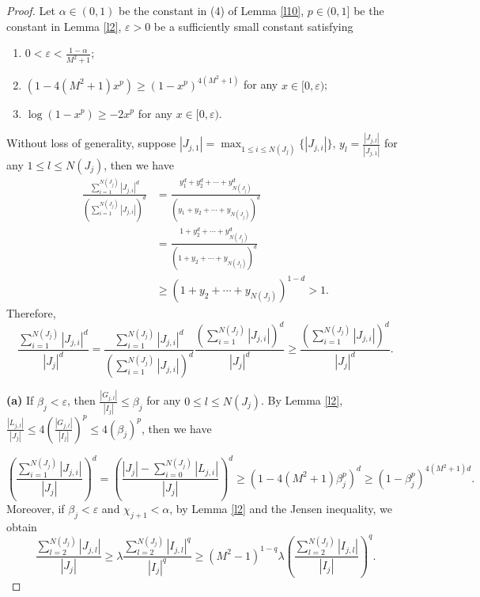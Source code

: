\documentclass[reqno]{amsart}
\theoremstyle{plain}
\theoremstyle{definition}
\theoremstyle{remark}
\numberwithin{equation}{section} \DeclareMathOperator\intr{int}
\begin{document}
\begin{proof}
Let $\alpha \in (0,1)$ be the constant in (4) of Lemma \ref{l10}, $p \in (0,1]$ be the constant in Lemma \ref{l2}, $\varepsilon>0$ be a sufficiently small constant satisfying
\begin{enumerate}
\item[\textup{(1)}]$0<\varepsilon<\frac{1-\alpha}{M^2+1}$;
\item[\textup{(2)}]$(1-4(M^2+1)x^p)\ge (1-x^p)^{4(M^2+1)}$ for any $x\in[0,\varepsilon)$;
\item[\textup{(3)}]$\log(1-x^p)\ge -2x^p$  for any $x\in[0,\varepsilon)$.
\end{enumerate}

Without loss of generality, suppose $\left | J_{j,1} \right |=\max_{1\le i \le N(J_j)}\{\left | J_{j,i} \right |\}  $, $y_l=\frac{\left | J_{j,l} \right | }{\left | J_{j,1} \right | } $ for any $1\le l\le N(J_j)$, then we have
\begin{equation}\label{333}
\begin{aligned}
\frac{\sum_{i  = 1}^{N(J_j)}\left | J_{j,i} \right |^d }{(\sum_{i  = 1}^{N(J_j)}\left | J_{j,i} \right |)^d }&=\frac{y_1^d+y_2^d+\cdots+y_{N(J_j)}^d}{(y_1+y_2+\cdots+y_{N(J_j)})^d}\\
&=  \frac{1+y_2^d+\cdots+y_{N(J_j)}^d}{(1+y_2+\cdots+y_{N(J_j)})^d}\\
&\ge (1+y_2+\cdots+y_{N(J_j)})^{1-d}>1.
\end{aligned}
\end{equation}
Therefore,
\begin{equation}\label{p12}
\frac{\sum_{i=1}^{N(J_j)}\left | J_{j,i} \right |^d }{\left | J_j \right |^d }= \frac{\sum_{i=1}^{N(J_j)}\left | J_{j,i} \right |^d }{(\sum_{i=1}^{N(J_j)}\left | J_{j,i} \right |)^d }\frac{{(\sum_{i=1}^{N(J_j)}\left | J_{j,i} \right |)^d }}{\left | J_j \right |^d}\ge \frac{{(\sum_{i=1}^{N(J_j)}\left | J_{j,i} \right |)^d }}{\left | J_j \right |^d}.
\end{equation}

\textbf{(a)} If $\beta_j<\varepsilon$, then $\frac{\left | G_{j,l} \right | }{\left | I_j \right | } \le\beta_j$  for any $0\le l \le N(J_j)$. By Lemma \ref{l2}, $\frac{\left | L_{j,l} \right | }{\left | J_j \right | }\le4(\frac{\left | G_{j,l} \right | }{\left | I_j \right | })^p \le4(\beta_j)^p $, then we have

\begin{equation}\label{619}
(\frac{{\sum_{i=1}^{N(J_j)}\left | J_{j,i} \right | }}{\left | J_j \right |})^d=(\frac{\left | J_{j} \right |-{\sum_{i=0}^{N(J_j)}\left | L_{j,i} \right | }}{\left | J_j \right |})^d\ge(1-4(M^2+1)\beta^p_j)^d\ge(1-\beta^p_j)^{4(M^2+1)d}.
\end{equation}
Moreover, if $\beta_j<\varepsilon$ and $\chi_{j+1}<\alpha$, by Lemma \ref{l2} and the Jensen inequality,
we obtain
\begin{equation}\label{620}
\frac{{\sum_{l=2}^{N(J_j)}\left | J_{j,l} \right | }}{\left | J_j \right |}\ge\lambda \frac{{\sum_{l=2}^{N(J_j)}\left | I_{j,l} \right |^q }}{\left | I_j \right |^q}\ge(M^2-1)^{1-q}\lambda(\frac{{\sum_{l=2}^{N(J_j)}\left | I_{j,l} \right | }}{\left | I_j \right |})^q.
\end{equation}


\end{proof}
\end{document}
